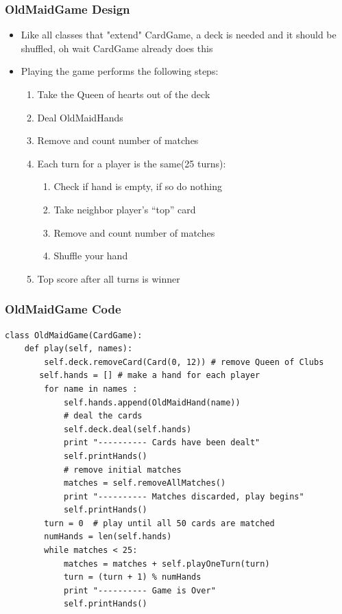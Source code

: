 \documentclass{beamer}
\newcommand\Fontix{\fontsize{9}{8.3}\selectfont}
\begin{document}
\begin{frame}[fragile]
\frametitle{OldMaidGame Design}
\begin{itemize}
\item Like all classes that "extend" CardGame, a deck is needed and it should be shuffled, oh wait CardGame already does this
\item Playing the game performs the following steps:
\begin{enumerate}
\item Take the Queen of hearts out of the deck
\item Deal OldMaidHands
\item Remove and count number of matches
\item Each turn for a player is the same(25 turns):
\begin{enumerate}
\item Check if hand is empty, if so do nothing
\item Take neighbor player’s “top” card
\item Remove and count number of matches
\item Shuffle your hand
\end{enumerate}
\item Top score after all turns is winner
\end{enumerate}
\end{itemize} 
\end{frame}

\begin{frame}[fragile]
\frametitle{OldMaidGame Code}
\Fontix
\begin{lstlisting}
class OldMaidGame(CardGame):
    def play(self, names):
        self.deck.removeCard(Card(0, 12)) # remove Queen of Clubs 
       self.hands = [] # make a hand for each player 
        for name in names :
            self.hands.append(OldMaidHand(name))
            # deal the cards 
            self.deck.deal(self.hands)
            print "---------- Cards have been dealt"
            self.printHands()
            # remove initial matches 
            matches = self.removeAllMatches()
            print "---------- Matches discarded, play begins"
            self.printHands()
	    turn = 0  # play until all 50 cards are matched 
        numHands = len(self.hands)
        while matches < 25:
            matches = matches + self.playOneTurn(turn)
            turn = (turn + 1) % numHands
            print "---------- Game is Over"
            self.printHands()
\end{lstlisting}
\end{frame}
\end{document}
